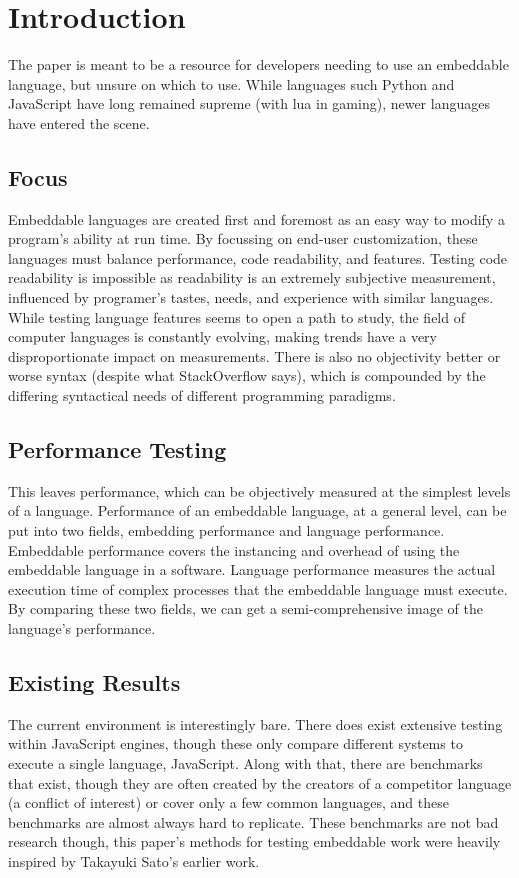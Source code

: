 \section{Introduction}
The paper is meant to be a resource for developers needing to use an embeddable language, but unsure on which to use. While languages such Python and JavaScript have long remained supreme (with lua in gaming)\cite{trend:jslua}, newer languages have entered the scene.

\subsection{Focus}
Embeddable languages are created first and foremost as an easy way to modify a program's ability at run time. By focussing on end-user customization, these languages must balance performance, code readability, and features. Testing code readability is impossible as readability is an extremely subjective measurement, influenced by programer's tastes, needs, and experience with similar languages. While testing language features seems to open a path to study, the field of computer languages is constantly evolving, making trends have a very disproportionate impact on measurements. There is also no objectivity better or worse syntax (despite what StackOverflow says), which is compounded by the differing syntactical needs of different programming paradigms.

\subsection{Performance Testing}
This leaves performance, which can be objectively measured at the simplest levels of a language. Performance of an embeddable language, at a general level, can be put into two fields, embedding performance and language performance. Embeddable performance covers the instancing and overhead of using the embeddable language in a software. Language performance measures the actual execution time of complex processes that the embeddable language must execute. By comparing these two fields, we can get a semi-comprehensive image of the language's performance.

\subsection{Existing Results}
The current environment is interestingly bare. There does exist extensive testing within JavaScript engines, though these only compare different systems to execute a single language, JavaScript\cite{arewefastyet}. Along with that, there are benchmarks that exist, though they are often created by the creators of a competitor language (a conflict of interest) or cover only a few common languages, and these benchmarks are almost always hard to replicate. These benchmarks are not bad research though, this paper's methods for testing embeddable work were heavily inspired by Takayuki Sato's earlier work\cite{embench}.

